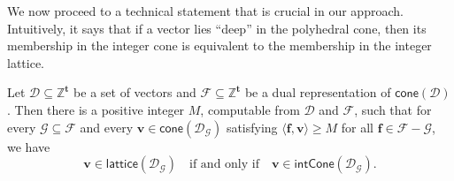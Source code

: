 \documentclass{theoretics}
\renewcommand{\geq}{\geqslant}
\newcommand{\Dd}{\mathcal{D}}
\newcommand{\Z}{\mathbb{Z}}
\newcommand{\tup}[1]{{\mathbf{#1}}}
\newcommand{\tv}{\tup t}
\newcommand{\ff}{\tup f}
\newcommand{\myvv}{\tup v} %
\newcommand{\Ff}{\mathcal{F}}
\newcommand{\Gg}{\mathcal{G}}
\newcommand{\sca}[2]{\langle #1,#2\rangle}
\renewcommand{\setminus}{-}
\newcommand{\realcone}{\mathsf{cone}}
\newcommand{\intcone}{\mathsf{intCone}}
\newcommand{\lattice}{\mathsf{lattice}}
\begin{document}
We now proceed to a technical statement that is crucial in our approach. Intuitively, it says that if a vector lies ``deep'' in the polyhedral cone, then its membership in the integer cone is equivalent to the membership in the integer lattice.

\begin{lemma}\label{lem:cornetto}
 Let $\Dd\subseteq \Z^\tv$ be a set of vectors and $\Ff\subseteq \Z^\tv$ be a dual representation of $\realcone(\Dd)$. Then there is a positive integer $M$, computable from $\Dd$ and $\Ff$, such that for every $\Gg\subseteq \Ff$ and every $\myvv\in \realcone(\Dd_\Gg)$ satisfying $\sca{\ff}{\myvv}\geq M$ for all $\ff\in \Ff\setminus \Gg$, we have
 $$\myvv\in \lattice(\Dd_\Gg)\quad\textrm{if and only if}\quad \myvv\in \intcone(\Dd_\Gg).$$
\end{lemma}
\end{document}
